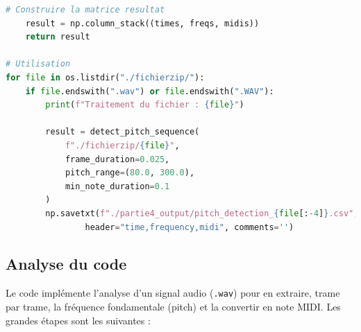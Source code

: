 \begin{lstlisting}[language=python]
    # Construire la matrice resultat
    result = np.column_stack((times, freqs, midis))
    return result

# Utilisation
for file in os.listdir("./fichierzip/"):
    if file.endswith(".wav") or file.endswith(".WAV"):
        print(f"Traitement du fichier : {file}")

        result = detect_pitch_sequence(
            f"./fichierzip/{file}",
            frame_duration=0.025,
            pitch_range=(80.0, 300.0),
            min_note_duration=0.1
        )
        np.savetxt(f"./partie4_output/pitch_detection_{file[:-4]}.csv", result, delimiter=",",
                header="time,frequency,midi", comments='')    
\end{lstlisting}

\subsection{Analyse du code}

Le code implémente l’analyse d’un signal audio (\texttt{.wav}) pour en extraire, trame par trame, la fréquence fondamentale (pitch) et la convertir en note MIDI. Les grandes étapes sont les suivantes :


